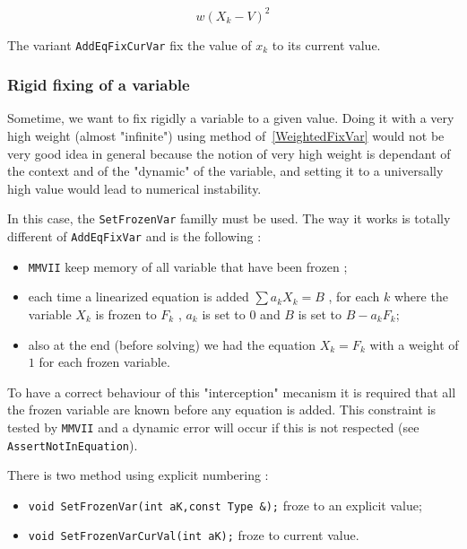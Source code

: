 \begin{equation}
      w (X_k -V)^2   
\end{equation}

The variant {\tt AddEqFixCurVar} fix the value of $x_k$ to its current value.


\subsubsection{Rigid fixing of a variable}

Sometime, we want to fix rigidly a variable to a given value.  Doing it with
a very high weight (almost "infinite") using method of~\ref{WeightedFixVar} would not be very 
good idea in general because the notion of very high weight is dependant of the context
and of the "dynamic" of the variable, and setting it to a universally  high value would lead to numerical 
instability.

In this case, the {\tt SetFrozenVar} familly must be used. The way it works is  totally
different of {\tt AddEqFixVar} and is the following :

\begin{itemize}
    \item {\tt MMVII} keep memory of all variable that have been frozen ;
    \item each time a linearized equation is added $\sum a_k X_k = B $ , for
             each $k$ where the variable $X_k$ is frozen to $F_k$ , $a_k$ is set to $0$ and $B$
             is set to $B - a_k F_k$;

    \item   also at the end (before solving) we had the equation $X_k=F_k$ with a weight of $1$
            for each frozen variable.
\end{itemize}

To have a correct behaviour of this "interception" mecanism it is required that all the frozen variable
are known before any equation is added. This constraint is tested by {\tt MMVII} and a dynamic
error will occur if this is not respected (see {\tt AssertNotInEquation}).

There is two method using explicit numbering :
\begin{itemize}
    \item {\tt void  SetFrozenVar(int aK,const  Type \&);} froze to an explicit value;
    \item {\tt void  SetFrozenVarCurVal(int aK);} froze to current value.
\end{itemize}

